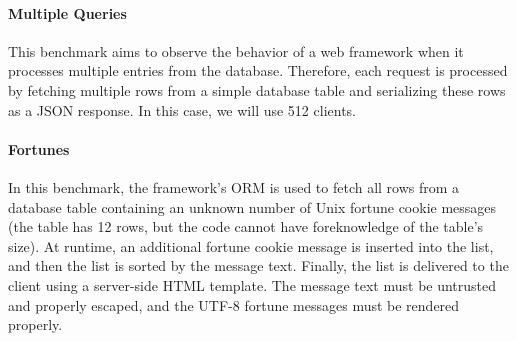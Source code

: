 \paragraph{Multiple Queries}
This benchmark aims to observe the behavior of a web framework when it processes multiple entries from the database.
Therefore, each request is processed by fetching multiple rows from a simple database table and serializing these rows as a JSON response.
In this case, we will use 512 clients.

\paragraph{Fortunes}
In this benchmark, the framework's ORM is used to fetch all rows from a database table containing an unknown number of Unix fortune cookie messages (the table has 12 rows, but the code cannot have foreknowledge of the table's size).
At runtime, an additional fortune cookie message is inserted into the list, and then the list is sorted by the message text.
Finally, the list is delivered to the client using a server-side HTML template.
The message text must be untrusted and properly escaped, and the UTF-8 fortune messages must be rendered properly.

